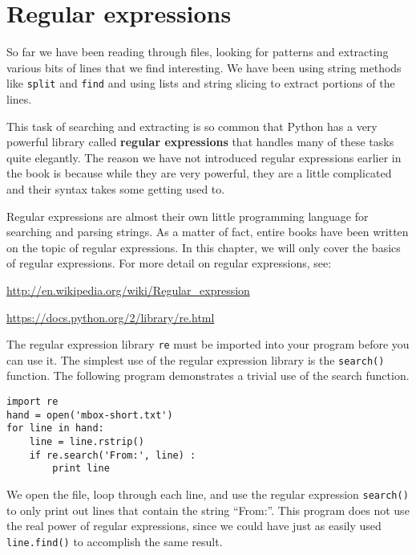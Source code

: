 
\chapter{Regular expressions}

So far we have been reading through files, looking for patterns and extracting various
bits of lines that we find interesting.  We have been using string methods like {\tt split}
and {\tt find} and using lists and string slicing to extract portions of the lines.

This task of searching and extracting is so common that Python has a very powerful library
called {\bf regular expressions} that handles many of these tasks quite elegantly.  The
reason we have not introduced regular expressions earlier in the book is because while they
are very powerful, they are a little complicated and their syntax takes some getting used to.

Regular expressions are almost their own little programming language for searching and parsing
strings.  As a matter of fact, entire books have been written on the topic of regular expressions.
In this chapter, we will only cover the basics of regular expressions.  For more detail on regular
expressions, see:

\url{http://en.wikipedia.org/wiki/Regular_expression}

\url{https://docs.python.org/2/library/re.html}

The regular expression library {\tt re} must be imported into your program before you can use it.
The simplest use of the regular expression library is the {\tt search()} function.  The following
program demonstrates a trivial use of the search function.

\beforeverb
\begin{verbatim}
import re
hand = open('mbox-short.txt')
for line in hand:
    line = line.rstrip()
    if re.search('From:', line) :
        print line
\end{verbatim}
\afterverb
%
We open the file, loop through each line, and use the regular expression {\tt search()} to
only print out lines that contain the string ``From:''.   This program does not use the real
power of regular expressions, since we could have just as easily used {\tt line.find()} to
accomplish the same result.

